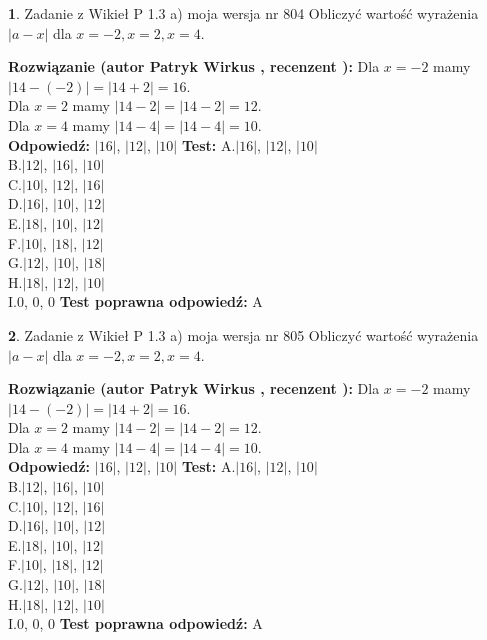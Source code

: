 \documentclass[12pt, a4paper]{article}
\theoremstyle{definition} %
\newtheorem{zad}{}
\newcommand{\zadStart}[1]{\begin{zad}#1\newline}
\newcommand{\zadStop}{\end{zad}}
\newcommand{\rozwStart}[2]{\noindent \textbf{Rozwiązanie (autor #1 , recenzent #2): }\newline}
\newcommand{\rozwStop}{\newline}
\newcommand{\odpStart}{\noindent \textbf{Odpowiedź:}\newline}
\newcommand{\odpStop}{\newline}
\newcommand{\testStart}{\noindent \textbf{Test:}\newline}
\newcommand{\testStop}{\newline}
\newcommand{\kluczStart}{\noindent \textbf{Test poprawna odpowiedź:}\newline}
\newcommand{\kluczStop}{\newline}
\begin{document}
\zadStart{Zadanie z Wikieł P 1.3 a) moja wersja nr 804}
Obliczyć wartość wyrażenia $|a - x|$ dla $x=-2,x=2,x=4$.
\zadStop
\rozwStart{Patryk Wirkus}{}
Dla $x = -2$ mamy $|14 - (-2)| = |14 + 2| = 16$.\\
Dla $x = 2$ mamy $|14 - 2| = |14 - 2| = 12$.\\
Dla $x = 4$ mamy $|14 - 4| = |14 - 4| = 10$.\\
\rozwStop
\odpStart
$|16|$, $|12|$, $|10|$
\odpStop
\testStart
A.$|16|$, $|12|$, $|10|$\\
B.$|12|$, $|16|$, $|10|$\\
C.$|10|$, $|12|$, $|16|$\\
D.$|16|$, $|10|$, $|12|$\\
E.$|18|$, $|10|$, $|12|$\\
F.$|10|$, $|18|$, $|12|$\\
G.$|12|$, $|10|$, $|18|$\\
H.$|18|$, $|12|$, $|10|$\\
I.$0$, $0$, $0$
\testStop
\kluczStart
A
\kluczStop



\zadStart{Zadanie z Wikieł P 1.3 a) moja wersja nr 805}
Obliczyć wartość wyrażenia $|a - x|$ dla $x=-2,x=2,x=4$.
\zadStop
\rozwStart{Patryk Wirkus}{}
Dla $x = -2$ mamy $|14 - (-2)| = |14 + 2| = 16$.\\
Dla $x = 2$ mamy $|14 - 2| = |14 - 2| = 12$.\\
Dla $x = 4$ mamy $|14 - 4| = |14 - 4| = 10$.\\
\rozwStop
\odpStart
$|16|$, $|12|$, $|10|$
\odpStop
\testStart
A.$|16|$, $|12|$, $|10|$\\
B.$|12|$, $|16|$, $|10|$\\
C.$|10|$, $|12|$, $|16|$\\
D.$|16|$, $|10|$, $|12|$\\
E.$|18|$, $|10|$, $|12|$\\
F.$|10|$, $|18|$, $|12|$\\
G.$|12|$, $|10|$, $|18|$\\
H.$|18|$, $|12|$, $|10|$\\
I.$0$, $0$, $0$
\testStop
\kluczStart
A
\kluczStop
\end{document}
